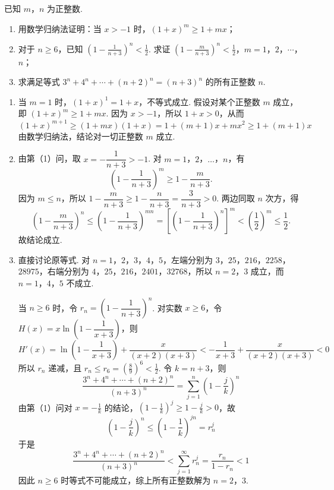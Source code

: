 \begin{problem}
已知 \(m\)，\(n\) 为正整数.

\begin{enumerate}
\item 用数学归纳法证明：当 \(x > -1\) 时，\((1 + x)^{m} \geqslant 1 + mx\)；
\item 对于 \(n \geqslant 6\)，已知 \(\left(1 - \frac{1}{n + 3}\right)^n < \frac{1}{2}\). 求证 \(\left(1 - \frac{m}{n + 3}\right)^n < \frac{1}{2}\)，\(m = 1\)，\(2\)，\(\cdots\)，\(n\)；
\item 求满足等式 \(3^{n} + 4^{n} + \cdots + (n + 2)^{n} = (n + 3)^{n}\) 的所有正整数 \(n\).
\end{enumerate}
\end{problem}

\begin{solution}
\begin{enumerate}
\item 当 \(m=1\) 时，\((1+x)^1=1+x\)，不等式成立. 假设对某个正整数 \(m\) 成立，即 \((1+x)^m\geqslant1+mx\). 因为 \(x>-1\)，所以 \(1+x>0\)，从而
\[
(1+x)^{m+1}\geqslant(1+mx)(1+x)=1+(m+1)x+mx^2\geqslant1+(m+1)x
\]
由数学归纳法，结论对一切正整数 \(m\) 成立.
\item 由第（1）问，取 \(x=-\dfrac{1}{n+3}>-1\). 对 \(m=1\)，\(2\)，\(\ldots\)，\(n\)，有
\[
\left(1-\frac{1}{n+3}\right)^m\geqslant 1-\frac{m}{n+3}.
\]
因为 \(m\leqslant n\)，所以 \(1-\dfrac{m}{n+3}\geqslant 1-\dfrac{n}{n+3}=\dfrac{3}{n+3}>0\). 两边同取 \(n\) 次方，得
\[
\left(1-\frac{m}{n+3}\right)^n\leqslant\left(1-\frac{1}{n+3}\right)^{mn}=\left[\left(1-\frac{1}{n+3}\right)^n\right]^m<\left(\frac12\right)^m\leqslant\frac12.
\]
故结论成立.
\item 直接讨论原等式. 对 \(n=1\)，\(2\)，\(3\)，\(4\)，\(5\)，左端分别为 \(3\)，\(25\)，\(216\)，\(2258\)，\(28975\)，右端分别为 \(4\)，\(25\)，\(216\)，\(2401\)，\(32768\)，所以 \(n=2\)，\(3\) 成立，而 \(n=1\)，\(4\)，\(5\) 不成立.

当 \(n\geqslant6\) 时，令 \(r_n=\left(1-\dfrac1{n+3}\right)^n\). 对实数 \(x\geqslant6\)，令 \(H(x)=x\ln\left(1-\dfrac1{x+3}\right)\)，则
\[
H'(x)=\ln\left(1-\frac1{x+3}\right)+\frac{x}{(x+2)(x+3)}< -\frac1{x+3}+\frac{x}{(x+2)(x+3)}<0
\]
所以 \(r_n\) 递减，且 \(r_n\leqslant r_6=(\frac{8}{9})^6<\frac{1}{2}\). 令 \(k=n+3\)，则
\[
\frac{3^n+4^n+\cdots+(n+2)^n}{(n+3)^n}=\sum_{j=1}^{n}\left(1-\frac{j}{k}\right)^n
\]
由第（1）问对 \(x=-\frac{1}{k}\) 的结论，\(\left(1-\frac{1}{k}\right)^j\geqslant1-\frac{j}{k}>0\)，故
\[
\left(1-\frac{j}{k}\right)^n\leqslant\left(1-\frac1k\right)^{jn}=r_n^j
\]
于是
\[
\frac{3^n+4^n+\cdots+(n+2)^n}{(n+3)^n}<\sum_{j=1}^{\infty}r_n^j=\frac{r_n}{1-r_n}<1
\]
因此 \(n\geqslant6\) 时等式不可能成立，综上所有正整数解为 \(n=2\)，\(3\).
\end{enumerate}
\end{solution}
